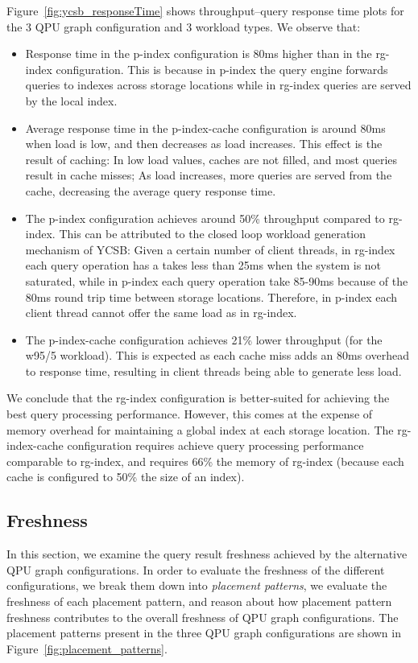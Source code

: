 Figure~\ref{fig:ycsb_responseTime} shows throughput--query response time plots for the 3 QPU graph configuration and 3 workload
types.
We observe that:
\begin{itemize}
  \item Response time in the p-index configuration is 80ms higher than in the rg-index configuration.
  This is because in p-index the query engine forwards queries to indexes across storage locations while
  in rg-index queries are served by the local index.
  \item Average response time in the p-index-cache configuration is around 80ms when load is low,
  and then decreases as load increases.
  This effect is the result of caching:
  In low load values, caches are not filled, and most queries result in cache misses;
  As load increases, more queries are served from the cache, decreasing the average query response time.
  \item The p-index configuration achieves around 50\% throughput compared to rg-index.
  This can be attributed to the closed loop workload generation mechanism of YCSB:
  Given a certain number of client threads, in rg-index each query operation has a takes less than 25ms
  when the system is not saturated, while in p-index each query operation take 85-90ms because of the 80ms
  round trip time between storage locations.
  Therefore, in p-index each client thread cannot offer the same load as in rg-index.
  \item The p-index-cache configuration achieves 21\% lower throughput (for the w95/5 workload).
  This is expected as each cache miss adds an 80ms overhead to response time,
  resulting in client threads being able to generate less load.
\end{itemize}

We conclude that the rg-index configuration is better-suited for achieving the best query processing performance.
However, this comes at the expense of memory overhead for maintaining a global index at each storage location.
The rg-index-cache configuration requires achieve query processing performance comparable to rg-index,
and requires 66\% the memory of rg-index (because each cache is configured to 50\% the size of an index).

\subsection{Freshness}

In this section, we examine the query result freshness achieved by the alternative QPU graph configurations.
In order to evaluate the freshness of the different configurations,
we break them down into \textit{placement patterns}, we evaluate the freshness of each placement pattern,
and reason about how placement pattern freshness contributes to the overall freshness of QPU graph configurations.
The placement patterns present in the three QPU graph configurations are shown in Figure~\ref{fig:placement_patterns}.

